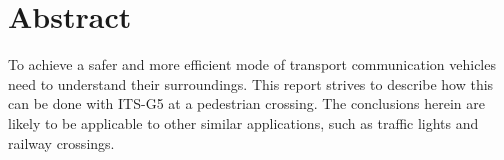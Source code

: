 \section{Abstract}
To achieve a safer and more efficient mode of transport communication vehicles need to understand their surroundings. This report strives to describe how this can be done with ITS-G5 at a pedestrian crossing. The conclusions herein are likely to be applicable to other similar applications, such as traffic lights and railway crossings.

